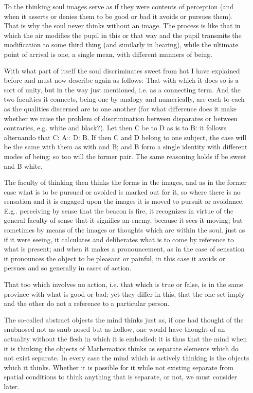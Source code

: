 To the thinking soul images serve as if they were contents of perception
(and when it asserts or denies them to be good or bad it avoids or
pursues them). That is why the soul never thinks without an image.
The process is like that in which the air modifies the pupil in this
or that way and the pupil transmits the modification to some third
thing (and similarly in hearing), while the ultimate point of arrival
is one, a single mean, with different manners of being. 

With what part of itself the soul discriminates sweet from hot I have
explained before and must now describe again as follows: That with
which it does so is a sort of unity, but in the way just mentioned,
i.e. as a connecting term. And the two faculties it connects, being
one by analogy and numerically, are each to each as the qualities
discerned are to one another (for what difference does it make whether
we raise the problem of discrimination between disparates or between
contraries, e.g. white and black?). Let then C be to D as is to B:
it follows alternando that C: A:: D: B. If then C and D belong to
one subject, the case will be the same with them as with and B; and
B form a single identity with different modes of being; so too will
the former pair. The same reasoning holds if be sweet and B white.

The faculty of thinking then thinks the forms in the images, and as
in the former case what is to be pursued or avoided is marked out
for it, so where there is no sensation and it is engaged upon the
images it is moved to pursuit or avoidance. E.g.. perceiving by sense
that the beacon is fire, it recognizes in virtue of the general faculty
of sense that it signifies an enemy, because it sees it moving; but
sometimes by means of the images or thoughts which are within the
soul, just as if it were seeing, it calculates and deliberates what
is to come by reference to what is present; and when it makes a pronouncement,
as in the case of sensation it pronounces the object to be pleasant
or painful, in this case it avoids or persues and so generally in
cases of action. 

That too which involves no action, i.e. that which is true or false,
is in the same province with what is good or bad: yet they differ
in this, that the one set imply and the other do not a reference to
a particular person. 

The so-called abstract objects the mind thinks just as, if one had
thought of the snubnosed not as snub-nosed but as hollow, one would
have thought of an actuality without the flesh in which it is embodied:
it is thus that the mind when it is thinking the objects of Mathematics
thinks as separate elements which do not exist separate. In every
case the mind which is actively thinking is the objects which it thinks.
Whether it is possible for it while not existing separate from spatial
conditions to think anything that is separate, or not, we must consider
later. 

